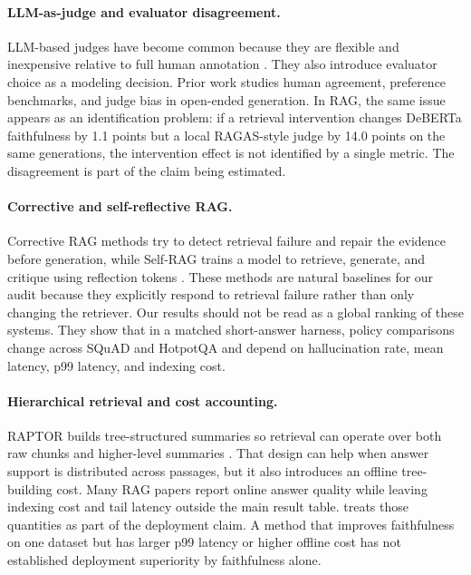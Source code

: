 \paragraph{LLM-as-judge and evaluator disagreement.}
LLM-based judges have become common because they are flexible and inexpensive
relative to full human annotation
\citep{liu2023geval,zheng2023judge}. They also introduce evaluator choice as
a modeling decision. Prior work studies human agreement, preference
benchmarks, and judge bias in open-ended generation. In RAG, the same issue
appears as an identification problem: if a retrieval intervention changes
DeBERTa faithfulness by 1.1 points but a local RAGAS-style judge by 14.0
points on the same generations, the intervention effect is not identified by a
single metric. The disagreement is part of the claim being estimated.

\paragraph{Corrective and self-reflective RAG.}
Corrective RAG methods try to detect retrieval failure and repair the evidence
before generation, while Self-RAG trains a model to retrieve, generate, and
critique using reflection tokens \citep{yan2024crag,asai2024selfrag}. These
methods are natural baselines for our audit because they explicitly respond to
retrieval failure rather than only changing the retriever. Our results should
not be read as a global ranking of these systems. They show that in a matched
short-answer harness, policy comparisons change across SQuAD and HotpotQA and
depend on hallucination rate, mean latency, p99 latency, and indexing cost.

\paragraph{Hierarchical retrieval and cost accounting.}
RAPTOR builds tree-structured summaries so retrieval can operate over both
raw chunks and higher-level summaries \citep{raptor2024}. That design can help
when answer support is distributed across passages, but it also introduces an
offline tree-building cost. Many RAG papers report online answer quality while
leaving indexing cost and tail latency outside the main result table.
\method{} treats those quantities as part of the deployment claim. A method
that improves faithfulness on one dataset but has larger p99 latency or higher
offline cost has not established deployment superiority by faithfulness alone.

